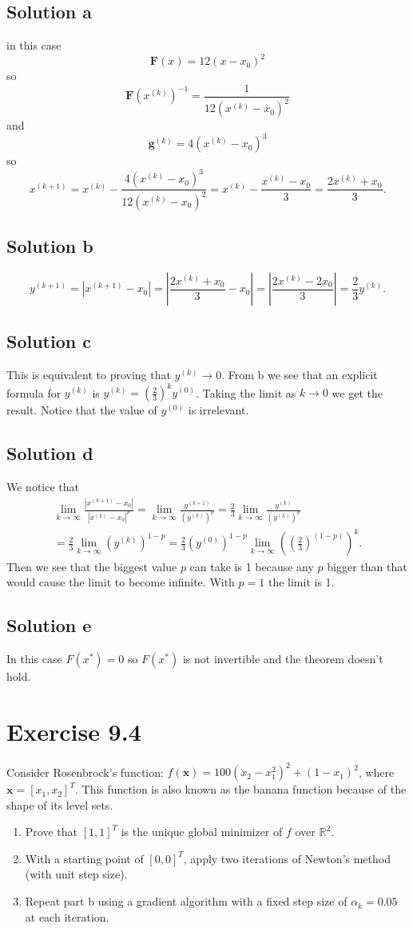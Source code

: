 \documentclass{article}
\newcommand{\bld}[1]{\boldsymbol{#1}}
\begin{document}
\subsection*{Solution a}
in this case
\[
	\bld{F}(x)=12(x-x_0)^2
\]
so
\[
	\bld{F}(x^{(k)})^{-1}=\frac{1}{12(x^{(k)}-x_0)^2}
\]
and
\[
	\bld{g}^{(k)}=4(x^{(k)}-x_0)^3
\]
so
\[
	x^{(k+1)}=x^{(k)}-\frac{4(x^{(k)}-x_0)^3}{12(x^{(k)}-x_0)^2}=
	x^{(k)}-\frac{x^{(k)}-x_0}{3} = \frac{2x^{(k)}+x_0}{3}.
\]
\subsection*{Solution b}
\[
	y^{(k+1)}=|x^{(k+1)}-x_0|=\left|\frac{2x^{(k)}+x_0}{3}-x_0\right|
	=\left|\frac{2x^{(k)}-2x_0}{3}\right|=\frac{2}{3}y^{(k)}.
\]
\subsection*{Solution c}
This is equivalent to proving that $y^{(k)}\to 0$. From b we see that an
explicit formula for $y^{(k)}$ is $y^{(k)}=\left(\frac{2}{3}\right)^ky^{(0)}$.
Taking the limit as $k\to 0$ we get the result. Notice that the value of
$y^{(0)}$ is irrelevant.
\subsection*{Solution d}
We notice that
\begin{multline*}
	\lim_{k\to \infty} \frac{|x^{(k+1)}-x_0|}{|x^{(k)}-x_0|^p} = \lim_{k\to
	\infty}\frac{y^{(k+1)}}{\left(y^{(k)}\right)^p}=
\frac{2}{3}\lim_{k\to\infty}\frac{y^{(k)}}{(y^{(k)})^p}\\
= \frac{2}{3}\lim_{k\to\infty}(y^{(k)})^{1-p} =
\frac{2}{3}(y^{(0)})^{1-p}\lim_{k\to\infty}\left(\left(\frac{2}{3}\right)^{(1-p)}\right)^k.
\end{multline*}
Then we see that the biggest value $p$ can take is 1 because any $p$ bigger
than that would cause the limit to become infinite. With $p=1$ the limit is 1.
\subsection*{Solution e}
In this case $F(x^*)=0$ so $F(x^*)$ is not invertible and the theorem doesn't
hold.
\section*{Exercise 9.4}
Consider Rosenbrock's function: $f(\bld{x})=100(x_2-x_1^2)^2+(1-x_1)^2$, where
$\bld{x}=[x_1,x_2]^T$. This function is also known as the banana function
because of the shape of its level sets.
\begin{enumerate}[label=\alph*.]
\item Prove that $[1,1]^T$ is the unique global minimizer of $f$ over
	$\mathbb{R}^2$.
\item With a starting point of $[0,0]^T$, apply two iterations of Newton's
	method (with unit step size).
\item Repeat part b using a gradient algorithm with a fixed step size of
	$\alpha_k=0.05$ at each iteration.
\end{enumerate}
\end{document}
